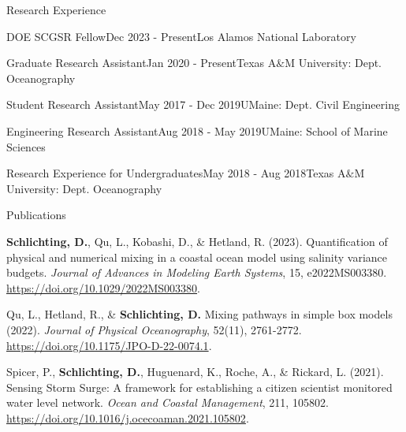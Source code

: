 \documentclass{resume} %
\begin{document}
\begin{rSection}{Research Experience}

\begin{rSubsection}{DOE SCGSR Fellow}{Dec 2023 - Present}{Los Alamos National Laboratory}{} 
\end{rSubsection}  

\begin{rSubsection}{Graduate Research Assistant}{Jan 2020 - Present}{Texas A$\&$M University: Dept. Oceanography}{} 
\end{rSubsection}    

\begin{rSubsection}{Student Research Assistant}{May 2017 - Dec 2019}{UMaine: Dept. Civil Engineering}{} 
\end{rSubsection}

\begin{rSubsection}{Engineering Research Assistant}{Aug 2018 - May 2019}{UMaine: School of Marine Sciences}{}
\end{rSubsection}

\begin{rSubsection}{Research Experience for Undergraduates}{May 2018 - Aug 2018}{Texas A$\&$M University: Dept. Oceanography}{} 

\end{rSubsection} 
\end{rSection} 
\vspace{-3pt}

\begin{rSection}{Publications}
\vspace{-3pt}

\begin{etaremune}
\item \textbf{Schlichting, D.}, Qu, L., Kobashi, D., \& Hetland, R. (2023). Quantification of physical and numerical mixing in a coastal ocean model using salinity variance budgets. \textit{Journal of Advances in Modeling Earth Systems},
15, e2022MS003380. \url{https://doi.org/10.1029/2022MS003380}.
\item Qu, L., Hetland, R., \& \textbf{Schlichting, D.} Mixing pathways in simple box models (2022). \textit{Journal of Physical Oceanography}, 52(11), 2761-2772. \url{https://doi.org/10.1175/JPO-D-22-0074.1}.
\item Spicer, P., \textbf{Schlichting, D.}, Huguenard, K., Roche, A., \& Rickard, L. (2021). Sensing Storm Surge: A framework for establishing a citizen scientist monitored water level network. \textit{Ocean and Coastal Management}, 211, 105802. \url{https://doi.org/10.1016/j.ocecoaman.2021.105802}.
\end{etaremune}
\end{rSection}
\end{document}
